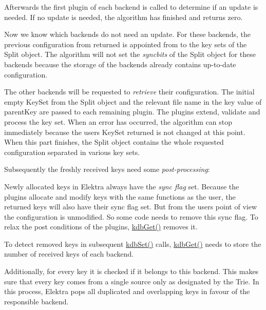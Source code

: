 Afterwards the first plugin of each backend is called to determine if an update is needed. If no update is needed, the algorithm has finished and returns zero.

Now we know which backends do not need an update. For these backends, the previous configuration from {\ttfamily returned} is appointed from to the key sets of the {\ttfamily Split} object. The algorithm will not set the {\itshape syncbits} of the {\ttfamily Split} object for these backends because the storage of the backends already contains up-\/to-\/date configuration.

The other backends will be requested to {\itshape retrieve} their configuration. The initial empty {\ttfamily Key\+Set} from the {\ttfamily Split} object and the relevant file name in the key value of {\ttfamily parent\+Key} are passed to each remaining plugin. The plugins extend, validate and process the key set. When an error has occurred, the algorithm can stop immediately because the user\textquotesingle{}s {\ttfamily Key\+Set} {\ttfamily returned} is not changed at this point. When this part finishes, the {\ttfamily Split} object contains the whole requested configuration separated in various key sets.

Subsequently the freshly received keys need some {\itshape post-\/processing}\+:


\begin{DoxyItemize}
\item Newly allocated keys in Elektra always have the {\itshape sync flag} set. Because the plugins allocate and modify keys with the same functions as the user, the returned keys will also have their sync flag set. But from the user\textquotesingle{}s point of view the configuration is unmodified. So some code needs to remove this sync flag. To relax the post conditions of the plugins, {\ttfamily \hyperlink{group__kdb_ga28e385fd9cb7ccfe0b2f1ed2f62453a1}{kdb\+Get()}} removes it.
\item To detect removed keys in subsequent {\ttfamily \hyperlink{group__kdb_ga11436b058408f83d303ca5e996832bcf}{kdb\+Set()}} calls, {\ttfamily \hyperlink{group__kdb_ga28e385fd9cb7ccfe0b2f1ed2f62453a1}{kdb\+Get()}} needs to store the number of received keys of each backend.
\item Additionally, for every key it is checked if it belongs to this backend. This makes sure that every key comes from a single source only as designated by the {\ttfamily Trie}. In this process, Elektra pops all duplicated and overlapping keys in favour of the responsible backend.
\end{DoxyItemize}

